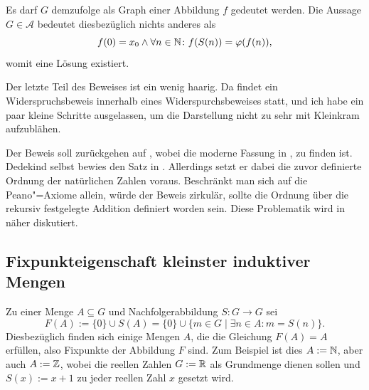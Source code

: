 \begin{Beweis}[Beweis]
Es darf $G$ demzufolge als Graph einer Abbildung $f$ gedeutet werden.
Die Aussage $G\in\mathcal A$ bedeutet diesbezüglich nichts anderes als
\[f(0)=x_0\land\forall n\in\mathbb N\colon f(S(n))=\varphi(f(n)),\]
womit eine Lösung existiert.\,\qedsymbol
\end{Beweis}

\noindent
Der letzte Teil des Beweises ist ein wenig haarig. Da findet ein
Widerspruchsbeweis innerhalb eines Widerspurchsbeweises statt,
und ich habe ein paar kleine Schritte ausgelassen, um die Darstellung
nicht zu sehr mit Kleinkram aufzublähen.

Der Beweis soll zurückgehen auf \cite{Lorenzen}, wobei die moderne
Fassung in \cite{Halmos}, \cite{Mainzer} zu finden ist.
Dedekind selbst bewies den Satz in \cite{Stach}. Allerdings setzt
er dabei die zuvor definierte Ordnung der natürlichen Zahlen
voraus. Beschränkt man sich auf die Peano"=Axiome allein, würde
der Beweis zirkulär, sollte die Ordnung über die rekursiv festgelegte
Addition definiert worden sein. Diese Problematik wird in \cite{Lamm}
näher diskutiert.

\subsection{Fixpunkteigenschaft kleinster induktiver Mengen}

Zu einer Menge $A\subseteq G$ und Nachfolgerabbildung $S\colon G\to G$ sei
\[F(A) := \{0\}\cup S(A) = \{0\}\cup\{m\in G\mid\exists n\in A\colon m = S(n)\}.\]
Diesbezüglich finden sich einige Mengen $A$, die die Gleichung $F(A)=A$
erfüllen, also Fixpunkte der Abbildung $F$ sind. Zum Beispiel ist dies
$A:=\mathbb N$, aber auch $A:=\mathbb Z$, wobei die reellen Zahlen $G:=\mathbb R$ als
Grundmenge dienen sollen und $S(x):=x+1$ zu jeder reellen Zahl $x$
gesetzt wird.

